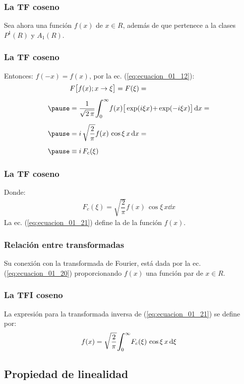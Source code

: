 \begin{frame}
\frametitle{La TF coseno}
Sea ahora una función  $f (x)$ de $x \in R$, \pause además de que pertenece a la clases $P^{1}(R)$ y $A_{1}(R)$.
\end{frame}
\begin{frame}
\frametitle{La TF coseno}
Entonces: $f(-x) = f (x)$, por la ec. (\ref{eq:ecuacion_01_12}):
\pause
\begin{eqnarray}
\begin{aligned}[b]
&F \big[ f (x); x \to \xi \big] = F (\xi) = \\[0.5em] \pause
&= \dfrac{1}{\sqrt{2 \, \pi}} \scaleint{6ex}_{\bs 0}^{\infty} f (x) \big[ \exp(i \xi x) {+} \exp(-i \xi x) \big] \dd{x} = \\[0.5em] \pause
&= i \, \sqrt{\dfrac{2}{\pi}} f (x) \, \cos \xi \, x \dd{x} = \\[0.5em] \pause
&\equiv i \, F_{c} (\xi)    
\end{aligned}
\label{eq:ecuacion_01_20}
\end{eqnarray}
\end{frame}
\begin{frame}
\frametitle{La TF coseno}
Donde:
\pause
\begin{align}
F_{c} (\xi) = \sqrt{\dfrac{2}{\pi}} f (x) \, \cos \xi \, x \dd{x}
\label{eq:ecuacion_01_21}
\end{align}
La ec. (\ref{eq:ecuacion_01_21}) define la  de la función $f (x)$.
\end{frame}
\begin{frame}
\frametitle{Relación entre transformadas}
Su conexión con la transformada de Fourier, está dada por la ec. (\ref{eq:ecuacion_01_20}) proporcionando $f (x)$ una función par de $x \in R$.
\end{frame}
\begin{frame}
\frametitle{La TFI coseno}
La expresión para la transformada inversa de (\ref{eq:ecuacion_01_21}) se define por:
\pause
\begin{align}
f (x) = \sqrt{\dfrac{2}{\pi}} \scaleint{6ex}_{\bs 0}^{\infty} F_{c}(\xi) \, \cos \xi \, x \dd{\xi}
\label{eq:ecuacion_01_22}
\end{align}
\end{frame}

\subsection{Propiedad de linealidad}

